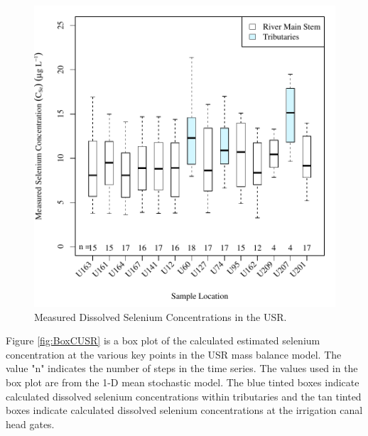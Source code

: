 \begin{linenumbers}
\begin{figure}[htbp]
\centering
	\includegraphics[width=6in]{"Figures/Results_USR/c BOX Measure CSe"}
	\caption[Measured Dissolved Selenium Concentrations in the USR.]{Measured Dissolved Selenium Concentrations in the USR.}
	\label{fig:BoxMUSR}
\end{figure}

Figure \ref{fig:BoxCUSR} is a box plot of the calculated estimated selenium concentration at the various key points in the USR mass balance model.  The value "n" indicates the number of steps in the time series.  The values used in the box plot are from the 1-D mean stochastic model.  The blue tinted boxes indicate calculated dissolved selenium concentrations within tributaries and the tan tinted boxes indicate calculated dissolved selenium concentrations at the irrigation canal head gates.


\end{linenumbers}
